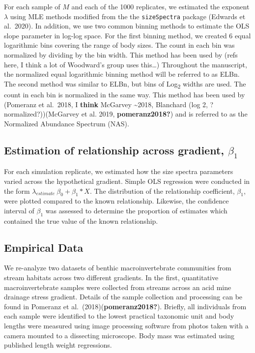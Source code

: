 \documentclass[
]{article}
\begin{document}
For each sample of \(M\) and each of the 1000 replicates, we estimated
the exponent \(\lambda\) using MLE methods modified from the the
\texttt{sizeSpectra} package (Edwards et al.~2020). In addition, we use
two common binning methods to estimate the OLS slope parameter in
log-log space. For the first binning method, we created 6 equal
logarithmic bins covering the range of body sizes. The count in each bin
was normalized by dividing by the bin width. This method has been used
by (refs here, I think a lot of Woodward's group uses this\ldots)
Throughout the manuscript, the normalized equal logarithmic binning
method will be referred to as ELBn. The second method was similar to
ELBn, but bins of Log\textsubscript{2} widths are used. The count in
each bin is normalized in the same way. This method has been used by
(Pomeranz et al.~2018, I \textbf{think} McGarvey \textasciitilde2018,
Blanchard (log 2, ?normalized?))(McGarvey et al. 2019,
\textbf{pomeranz2018?}) and is referred to as the Normalized Abundance
Spectrum (NAS).

\hypertarget{estimation-of-relationship-across-gradient-beta_1}{%
\subsection{\texorpdfstring{Estimation of relationship across gradient,
\(\beta_1\)}{Estimation of relationship across gradient, \textbackslash beta\_1}}\label{estimation-of-relationship-across-gradient-beta_1}}

For each simulation replicate, we estimated how the size spectra
parameters varied across the hypothetical gradient. Simple OLS
regression were conducted in the form
\(\lambda_{estimate} ~ \beta_0 + \beta_1 * X\). The distribution of the
relationship coefficient, \(\beta_1\), were plotted compared to the
known relationship. Likewise, the confidence interval of \(\beta_1\) was
assessed to determine the proportion of estimates which contained the
true value of the known relationship.

\hypertarget{empirical-data}{%
\subsection{Empirical Data}\label{empirical-data}}

We re-analyze two datasets of benthic macroinvertebrate communities from
stream habitats across two different gradients. In the first,
quantitative macroinvertebrate samples were collected from streams
across an acid mine drainage stress gradient. Details of the sample
collection and processing can be found in Pomeranz et
al.~(2018)(\textbf{pomeranz2018?}). Briefly, all individuals from each
sample were identified to the lowest practical taxonomic unit and body
lengths were measured using image processing software from photos taken
with a camera mounted to a dissecting microscope. Body mass was
estimated using published length weight regressions.
\end{document}
